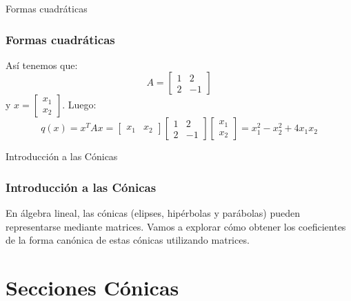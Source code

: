\documentclass[xcolor={dvipsnames},aspectratio=169,10pt]{beamer}
\begin{document}
\begin{frame}{Formas cuadráticas}
  \frametitle{Formas cuadráticas}
  Así tenemos que:
  \begin{equation*}
    A = \begin{bmatrix}
      1 & 2 \\
      2 & -1
    \end{bmatrix}
  \end{equation*}
  y $x = \begin{bmatrix}
    x_1 \\
    x_2
  \end{bmatrix}$.
  Luego:
  \begin{equation*}
    q(x) = x^{T}Ax = \begin{bmatrix}
      x_1 & x_2
    \end{bmatrix}
    \begin{bmatrix}
      1 & 2 \\
      2 & -1
    \end{bmatrix}
    \begin{bmatrix}
      x_1 \\
      x_2
    \end{bmatrix}
    = x_1^2 - x_2^2 + 4x_1x_2
  \end{equation*}
\end{frame}

\begin{frame}{Introducción a las Cónicas}
  \frametitle{Introducción a las Cónicas}
  En álgebra lineal, las cónicas (elipses, hipérbolas y parábolas) pueden representarse mediante matrices. Vamos a explorar cómo obtener los coeficientes de la forma canónica de estas cónicas utilizando matrices.
\end{frame}

\section{Secciones Cónicas}
\end{document}
